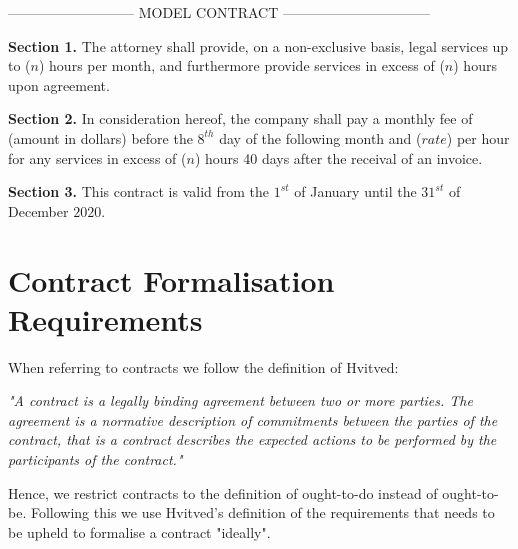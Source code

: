 \documentclass{ituthesis}
\begin{document}
--------------------------- MODEL CONTRACT --------------------------------

\begin{tcolorbox}
\textbf{Section 1.} The attorney shall provide, on a non-exclusive basis, legal services up to ($n$) hours per month, and furthermore provide services in excess of ($n$) hours upon agreement.\par
\textbf{Section 2.} In consideration hereof, the company shall pay a monthly fee of (amount in dollars) before the $8^{th}$ day of the following month and ($rate$) per hour for any services in excess of ($n$) hours 40 days after the receival of an invoice.\par
\textbf{Section 3.} This contract is valid from the $1^{st}$ of January until the $31^{st}$ of December $2020$.
\end{tcolorbox}

\section{Contract Formalisation Requirements}
When referring to contracts we follow the definition of Hvitved:
\begin{displayquote}
\textit{"A contract is a legally binding agreement between two or more parties. The agreement is a normative description of commitments between the parties of the contract, that is a contract describes the expected actions to be performed by the participants of the contract."}
\cite{hvitved2011contract}
\end{displayquote}

Hence, we restrict contracts to the definition of ought-to-do instead of ought-to-be. Following this we use Hvitved's definition of the requirements that needs to be upheld to formalise a contract "ideally".
\end{document}
